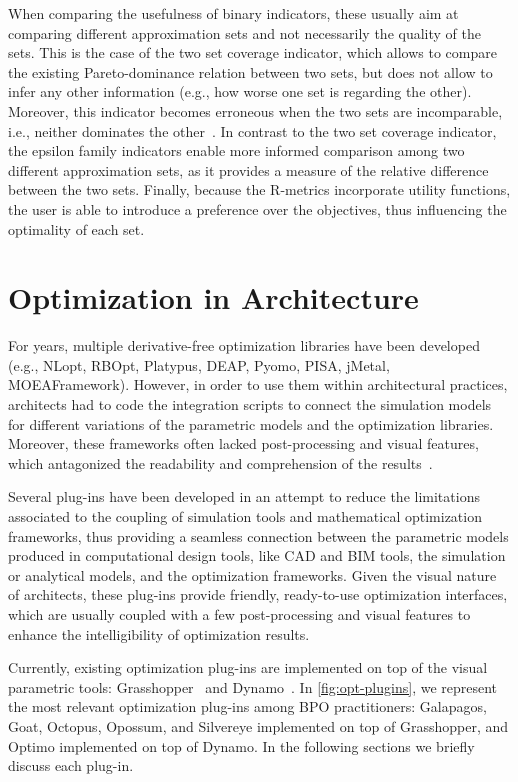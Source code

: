 	When comparing the usefulness of binary indicators, these usually aim at comparing different approximation sets and not necessarily the quality of the sets. This is the case of the two set coverage indicator, which allows to compare the existing Pareto-dominance relation between two sets, but does not allow to infer any other information (e.g., how worse one set is regarding the other). Moreover, this indicator becomes erroneous when the two sets are incomparable, i.e., neither dominates the other~\cite{Zitzler2003Metrics}. In contrast to the two set coverage indicator, the epsilon family indicators enable more informed comparison among two different approximation sets, as it provides a measure of the relative difference between the two sets. Finally, because the R-metrics incorporate utility functions, the user is able to introduce a preference over the objectives, thus influencing the optimality of each set. 
	
	
	\section{Optimization in Architecture}	
	\label{sec:optimizationtools}
	
	For years, multiple derivative-free optimization libraries have been developed (e.g., NLopt, RBOpt, Platypus, DEAP, Pyomo, PISA, jMetal, MOEAFramework). However, in order to use them within architectural practices, architects had to code the integration scripts to connect the simulation models for different variations of the parametric models and the optimization libraries\cite{Attia2013}. Moreover, these frameworks often lacked post-processing and visual features, which antagonized the readability and comprehension of the results~\cite{Attia2013,Nguyen2014}.
	
	Several plug-ins have been developed in an attempt to reduce the limitations associated to the coupling of simulation tools and mathematical optimization frameworks, thus providing a seamless connection between the parametric models produced in computational design tools, like \ac{CAD} and \ac{BIM} tools, the simulation or analytical models, and the optimization frameworks. Given the visual nature of architects, these plug-ins provide friendly, ready-to-use optimization interfaces, which are usually coupled with a few post-processing and visual features to enhance the intelligibility of optimization results. 
	
	Currently, existing optimization plug-ins are implemented on top of the visual parametric tools: Grasshopper~\cite{GRASSHOPPER} and Dynamo~\cite{DYNAMOBIM}. In \cref{fig:opt-plugins}, we represent the most relevant optimization plug-ins among \ac{BPO} practitioners: Galapagos, Goat, Octopus, Opossum, and Silvereye implemented on top of Grasshopper, and Optimo implemented on top of Dynamo. In the following sections we briefly discuss each plug-in.
	
